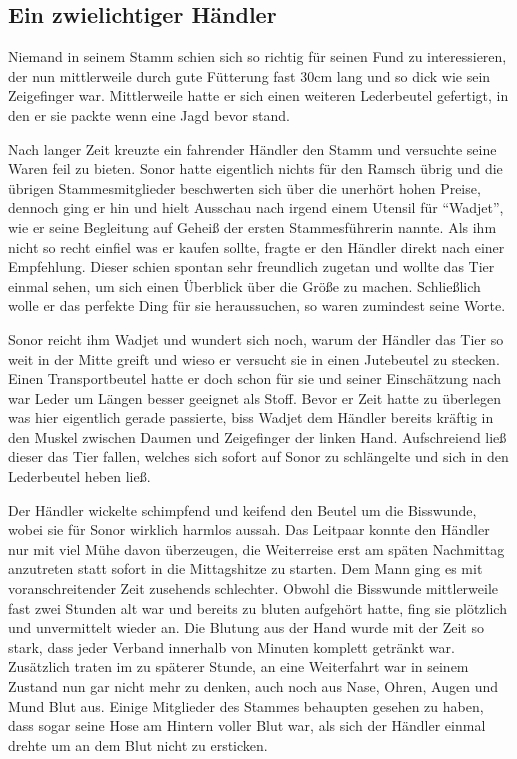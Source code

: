 	\subsection{Ein zwielichtiger Händler}
	Niemand in seinem Stamm schien sich so richtig für seinen Fund zu interessieren, der nun mittlerweile durch gute Fütterung fast 30cm lang und so dick wie sein Zeigefinger war.
	Mittlerweile hatte er sich einen weiteren Lederbeutel gefertigt, in den er sie packte wenn eine Jagd bevor stand.
	
	Nach langer Zeit kreuzte ein fahrender Händler den Stamm und versuchte seine Waren feil zu bieten.
	Sonor hatte eigentlich nichts für den Ramsch übrig und die übrigen Stammesmitglieder beschwerten sich über die unerhört hohen Preise, dennoch ging er hin und hielt Ausschau nach irgend einem Utensil für \enquote{Wadjet}, wie er seine Begleitung auf Geheiß der ersten Stammesführerin nannte.
	Als ihm nicht so recht einfiel was er kaufen sollte, fragte er den Händler direkt nach einer Empfehlung.
	Dieser schien spontan sehr freundlich zugetan und wollte das Tier einmal sehen, um sich einen Überblick über die Größe zu machen. Schließlich wolle er das perfekte Ding für sie heraussuchen, so waren zumindest seine Worte.
	
	Sonor reicht ihm Wadjet und wundert sich noch, warum der Händler das Tier so weit in der Mitte greift und wieso er versucht sie in einen Jutebeutel zu stecken. 
	Einen Transportbeutel hatte er doch schon für sie und seiner Einschätzung nach war Leder um Längen besser geeignet als Stoff.
	Bevor er Zeit hatte zu überlegen was hier eigentlich gerade passierte, biss Wadjet dem Händler bereits kräftig in den Muskel zwischen Daumen und Zeigefinger der linken Hand. Aufschreiend ließ dieser das Tier fallen, welches sich sofort auf Sonor zu schlängelte und sich in den Lederbeutel heben ließ.
	
	Der Händler wickelte schimpfend und keifend den Beutel um die Bisswunde, wobei sie für Sonor wirklich harmlos aussah. 
	Das Leitpaar konnte den Händler nur mit viel Mühe davon überzeugen, die Weiterreise erst am späten Nachmittag anzutreten statt sofort in die Mittagshitze zu starten.
	Dem Mann ging es mit voranschreitender Zeit zusehends schlechter. 
	Obwohl die Bisswunde mittlerweile fast zwei Stunden alt war und bereits zu bluten aufgehört hatte, fing sie plötzlich und unvermittelt wieder an.
	Die Blutung aus der Hand wurde mit der Zeit so stark, dass jeder Verband innerhalb von Minuten komplett getränkt war. 
	Zusätzlich traten im zu späterer Stunde, an eine Weiterfahrt war in seinem Zustand nun gar nicht mehr zu denken, auch noch aus Nase, Ohren, Augen und Mund Blut aus.
	Einige Mitglieder des Stammes behaupten gesehen zu haben, dass sogar seine Hose am Hintern voller Blut war, als sich der Händler einmal drehte um an dem Blut nicht zu ersticken.
	

